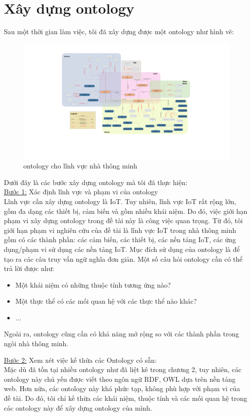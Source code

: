 \section{Xây dựng ontology}
Sau một thời gian làm việc, tôi đã xây dựng được một ontology như hình vẽ:

\begin{figure}[h!]
	\center
	\includegraphics[scale=0.2, center]{image/ontology-2}
	\caption{ontology cho lĩnh vực nhà thông minh}
\end{figure}


Dưới đây là các bước xây dựng ontology mà tôi đã thực hiện:\\
\underline{Bước 1:} Xác định lĩnh vực và phạm vi của ontology \\
Lĩnh vực cần xây dựng ontology là IoT. Tuy nhiên, lĩnh vực IoT rất rộng lớn, gồm đa dạng các thiết bị, cảm biến và gồm nhiều khái niệm. Do đó, việc giới hạn phạm vi xây dựng ontology trong đề tài này là công việc quan trọng. Từ đó, tôi giới hạn phạm vi nghiên cứu của đề tài là lĩnh vực IoT trong nhà thông minh gồm có các thành phần: các cảm biến, các thiết bị, các nền tảng IoT, các ứng dụng/phạm vi sử dụng các nền tảng IoT. 
Mục đích sử dụng của ontology là để tạo ra các câu truy vấn ngữ nghĩa đơn giản. Một số câu hỏi ontology cần có thể trả lời được như:
\begin{itemize}
	\item Một khái niệm có những thuộc tính tương ứng nào?
	\item Một thực thể có các mối quan hệ với các thực thể nào khác?
	\item ...
\end{itemize}
Ngoài ra, ontology cũng cần có khả năng mở rộng so với các thành phần trong ngôi nhà thông minh. 

\underline{Bước 2:} Xem xét việc kế thừa các Ontology có sẵn: \\
Mặc dù đã tồn tại nhiều ontology như đã liệt kê trong chương 2, tuy nhiên, các ontology này chủ yếu được viết theo ngôn ngữ RDF, OWL dựa trên nền tảng web. Hơn nữa, các ontology này khá phức tạp, không phù hợp với phạm vi của đề tài. Do đó, tôi chỉ kế thừa các khái niệm, thuộc tính và các mối quan hệ trong các ontology này để xây dựng ontology của mình.

